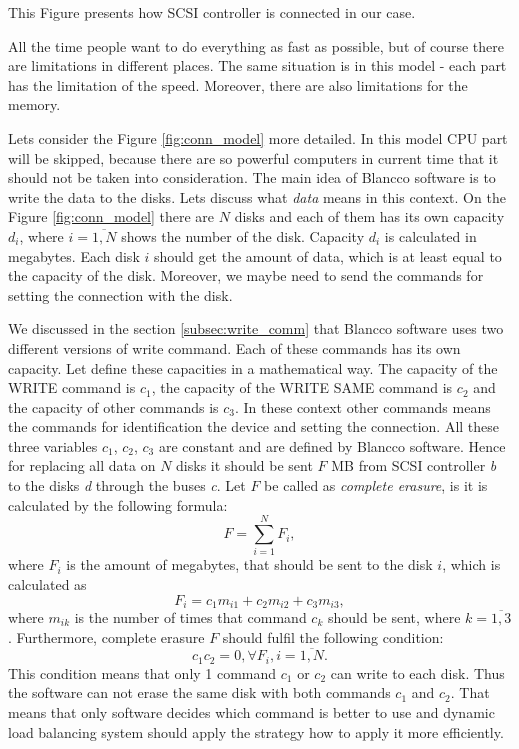 This Figure presents how SCSI controller is connected in our case.  

All the time people want to do everything as fast as possible, but of course there are limitations in different places. The same situation is in this model - each part has the limitation of the speed. Moreover, there are also limitations for the memory.


Lets consider the Figure \ref{fig:conn_model} more detailed. In this model CPU part will be skipped, because there are so powerful computers in current time that it should not be taken into consideration. The main idea of Blancco software is to write the data to the disks. Lets discuss what \emph{data} means in this context. On the Figure \ref{fig:conn_model} there are $N$ disks and each of them has its own capacity $d_i$, where $i=\overline{1,N}$ shows the number of the disk. Capacity $d_i$ is calculated in megabytes. Each disk $i$ should get the amount of data, which is at least equal to the capacity of the disk. Moreover, we maybe need to send the commands for setting the connection with the disk. 


We discussed in the section \ref{subsec:write_comm} that Blancco software uses two different versions of write command. Each of these commands has its own capacity. Let define these capacities in a mathematical way. The capacity of the WRITE command is $c_1$, the capacity of the WRITE SAME command is $c_2$ and the capacity of other commands is $c_3$. In these context other commands means the commands for identification the device and setting the connection. All these three variables $c_1$, $c_2$, $c_3$ are constant and are defined by Blancco software. Hence for replacing all data on $N$ disks it should be sent $F$ MB from SCSI controller \emph{b} to the disks \emph{d} through the buses \emph{c}. Let $F$ be called as \emph{complete erasure}, is it is calculated by the following formula:
\begin{equation}
\label{eq:comp_erasure}
	F = \sum_{i=1}^{N}F_i,
\end{equation}
where $F_i$ is the amount of megabytes, that should be sent to the disk $i$, which is calculated as
\begin{equation}
	F_i = c_1 m_{i1} + c_2 m_{i2} + c_3 m_{i3},
\end{equation}
where $m_{ik}$ is the number of times that command $c_k$ should be sent, where $k=\overline{1,3}$. Furthermore, complete erasure $F$ should fulfil the following condition:
\begin{equation}
\label{eq:write_cond}
	c_1 c_2 = 0, \forall F_i, i=\overline{1,N}.
\end{equation}
This condition means that only 1 command $c_1$ or $c_2$ can write to each disk. Thus the software can not erase the same disk with both commands $c_1$ and $c_2$. That means that only software decides which command is better to use and dynamic load balancing system should apply the strategy how to apply it more efficiently.


